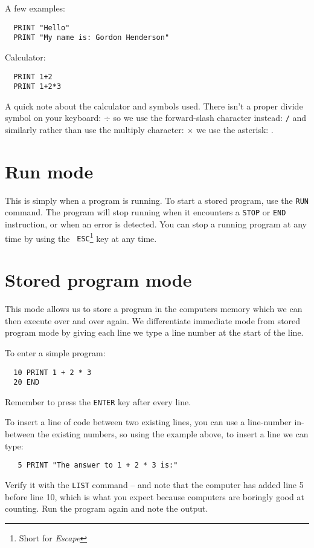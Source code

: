 \noindent
A few examples:
\begin{verbatim}
  PRINT "Hello"
  PRINT "My name is: Gordon Henderson"
\end{verbatim}
Calculator:
\begin{verbatim}
  PRINT 1+2
  PRINT 1+2*3
\end{verbatim}

A \meek quick note about the calculator and symbols used. There isn't a
proper divide symbol on your keyboard: $\div$ so we use the forward-slash
character instead: {\tt /} and similarly rather than use the multiply
character: $\times$ we use the asterisk: {\tt *}.

\section{Run mode}
This is simply when a program is running. To start a stored program,
use the {\tt RUN} command. The program will stop running when it
encounters a {\tt STOP} or {\tt END} instruction, or when an error is
detected. You can stop a running program at any time by using the {\tt
ESC}\footnote{Short for {\em Escape}} key at any time.

\section{Stored program mode}

This mode allows us to store a program in the computers memory which we
can then execute over and over again. We differentiate immediate mode
from stored program mode by giving each line we type a line number at
the start of the line.

\noindent
To enter a simple program:
\begin{verbatim}
  10 PRINT 1 + 2 * 3
  20 END
\end{verbatim}
Remember to press the {\tt ENTER} key after every line.

To insert a line of code between two existing lines, you can use a
line-number in-between the existing numbers, so using the example above,
to insert a line we can type:
\begin{verbatim}
   5 PRINT "The answer to 1 + 2 * 3 is:"
\end{verbatim}
Verify it with the {\tt LIST} command -- and note that the computer has
added line 5 before line 10, which is what you expect because computers
are boringly good at counting. Run the program again and note the output.

